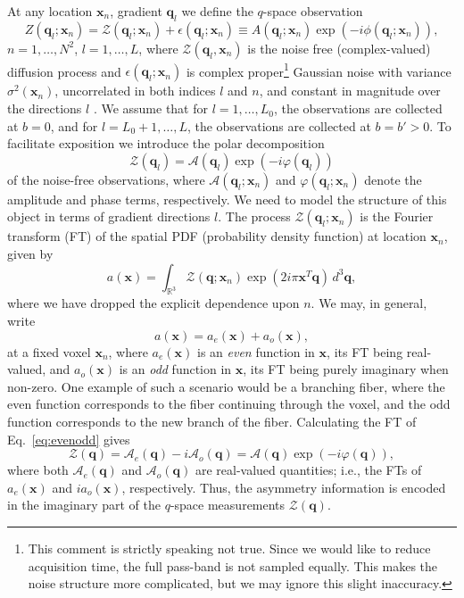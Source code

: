 \documentclass[authoryear,preprint,12pt]{elsarticle}
\newcommand{\q}{\mathbf{q}}
\newcommand{\x}{\mathbf{x}}
\newcommand{\cA}{\mathcal{A}}
\newcommand{\bbR}{\mathbb{R}}
\newcommand{\cZ}{\mathcal{Z}}
\newcommand{\eps}{\epsilon}
\begin{document}
At any location $\x_n$, gradient $\q_l$ we define the $q$-space
observation
\begin{equation}\label{qxeqn}
  Z(\q_l;\x_n) = \cZ(\q_l;\x_n) + \eps(\q_l;\x_n) \equiv
  A(\q_l;\x_n) \exp\left(-i\phi(\q_l;\x_n)\right),
\end{equation}
$n=1,\dots,N^2$, $l=1,\dots,L$, where $\cZ(\q_l,\x_n)$ is the noise
free (complex-valued) diffusion process and $\eps(\q_l;\x_n)$ is
complex proper\footnote{This comment is strictly speaking not true.
  Since we would like to reduce acquisition time, the full pass-band
  is not sampled equally.  This makes the noise structure more
  complicated, but we may ignore this slight inaccuracy.}  Gaussian
noise with variance $\sigma^2(\x_n)$, uncorrelated in both indices $l$
and $n$, and constant in magnitude over the directions $l$
\citep{Picinbono1996}.  We assume that for $l=1,\dots,L_0$, the
observations are collected at $b=0$, and for $l=L_0+1,\dots,L$, the
observations are collected at $b=b'>0$.  To facilitate exposition we
introduce the polar decomposition
\begin{equation}
  \cZ(\q_l) = \cA(\q_l) \exp\left(-i\varphi(\q_l)\right)
\end{equation}
of the noise-free observations, where $\cA(\q_l;\x_n)$ and
$\varphi(\q_l;\x_n)$ denote the amplitude and phase terms,
respectively.  We need to model the structure of this object in terms
of gradient directions $l$.  The process $\cZ(\q_l;\x_n)$ is the
Fourier transform (FT) of the spatial PDF (probability density
function) at location $\x_n$, given by
\begin{equation}
  a(\x) = \int_{\bbR^3} \cZ(\q;\x_n) \exp\left(2i\pi\x^T\q\right) \,
  d^3 \q,
\end{equation}
where we have dropped the explicit dependence upon $n$.  We may, in
general, write
\begin{equation}\label{eq:evenodd}
  a(\x) = a_e(\x) + a_o(\x),
\end{equation}
at a fixed voxel $\x_n$, where $a_e(\x)$ is an \textit{even} function
in $\x$, its FT being real-valued, and $a_o(\x)$ is an \textit{odd}
function in $\x$, its FT being purely imaginary when non-zero.  One
example of such a scenario would be a branching fiber, where the even
function corresponds to the fiber continuing through the voxel, and
the odd function corresponds to the new branch of the fiber.
Calculating the FT of Eq.~\eqref{eq:evenodd} gives
\begin{equation}\label{eq:evenoddF}
  \cZ(\q) = \cA_e(\q)-i \cA_o(\q) = \cA(\q)
  \exp\left(-i\varphi(\q)\right),
\end{equation}
where both $\cA_e(\q)$ and $\cA_o(\q)$ are real-valued quantities;
i.e., the FTs of $a_e(\x)$ and $ia_o(\x)$, respectively.  Thus, the
asymmetry information is encoded in the imaginary part of the
$q$-space measurements $\cZ(\q)$.
\end{document}
